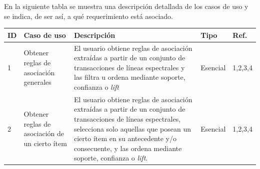 En la siguiente tabla se muestra una descripción detallada de los casos de uso y se indica, de ser así, a qué requerimiento está asociado.

\begin{tabular}{|l|p{4cm}|p{7cm}|l|l|}
	\hline
	ID & Caso de uso & Descripción & Tipo & Ref. \\ \hline
	1 & Obtener reglas de asociación generales & El usuario obtiene reglas de asociación extraídas a partir de un conjunto de transacciones de líneas espectrales y las filtra u ordena mediante soporte, confianza o \textit{lift} & Esencial & 1,2,3,4 \\ \hline
	2 & Obtener reglas de asociación de un cierto ítem & El usuario obtiene reglas de asociación extraídas a partir de un conjunto de transacciones de líneas espectrales, selecciona solo aquellas que posean un cierto ítem en su antecedente y/o consecuente, y las ordena mediante soporte, confianza o \textit{lift}. & Esencial & 1,2,3,4 \\ \hline
\end{tabular}
